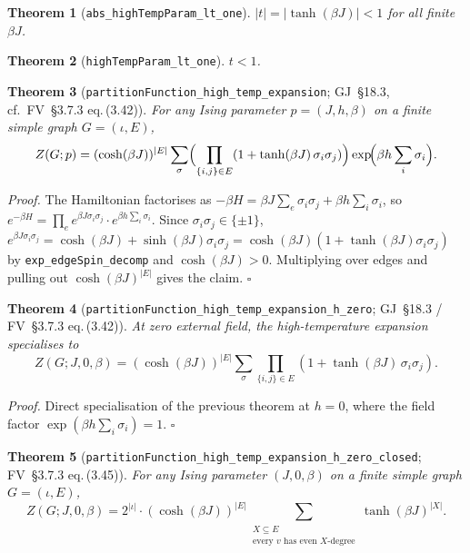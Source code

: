 \documentclass[a4paper,11pt]{article}
\newtheorem{theorem}{Theorem}
\begin{document}
\begin{theorem}[\texttt{abs\_highTempParam\_lt\_one}]
$|t| = |\tanh(\beta J)| < 1$ for all finite $\beta J$.
\end{theorem}

\begin{theorem}[\texttt{highTempParam\_lt\_one}]
$t < 1$.
\end{theorem}

\begin{theorem}[\texttt{partitionFunction\_high\_temp\_expansion}; GJ~\S18.3,
cf.\ FV~\S3.7.3 eq.\,(3.42)]
For any Ising parameter $p = (J, h, \beta)$ on a finite simple graph
$G = (\iota, E)$,
\[
Z(G; p) = (\cosh(\beta J))^{|E|}
\sum_{\sigma}
\Bigl(\prod_{\{i,j\} \in E} (1 + \tanh(\beta J)\,\sigma_i\sigma_j)\Bigr)
\exp\!\Bigl(\beta h \sum_i \sigma_i\Bigr).
\]
\end{theorem}

\textit{Proof.} The Hamiltonian factorises as
$-\beta H = \beta J \sum_e \sigma_i\sigma_j + \beta h \sum_i \sigma_i$,
so $e^{-\beta H} = \prod_e e^{\beta J \sigma_i\sigma_j} \cdot
e^{\beta h \sum_i \sigma_i}$.
Since $\sigma_i\sigma_j \in \{\pm 1\}$,
$e^{\beta J \sigma_i\sigma_j} = \cosh(\beta J) + \sinh(\beta J)\sigma_i\sigma_j
= \cosh(\beta J)(1 + \tanh(\beta J)\sigma_i\sigma_j)$
by \texttt{exp\_edgeSpin\_decomp} and $\cosh(\beta J) > 0$.
Multiplying over edges and pulling out $\cosh(\beta J)^{|E|}$ gives the claim.
\hfill$\square$

\begin{theorem}[\texttt{partitionFunction\_high\_temp\_expansion\_h\_zero}; GJ~\S18.3 / FV~\S3.7.3 eq.\,(3.42)]
At zero external field, the high-temperature expansion specialises to
\[
Z(G; J, 0, \beta) = (\cosh(\beta J))^{|E|}
\sum_{\sigma}
\prod_{\{i,j\} \in E} (1 + \tanh(\beta J)\,\sigma_i\sigma_j).
\]
\end{theorem}

\textit{Proof.} Direct specialisation of the previous theorem at $h = 0$,
where the field factor $\exp(\beta h \sum_i \sigma_i) = 1$.
\hfill$\square$

\begin{theorem}[\texttt{partitionFunction\_high\_temp\_expansion\_h\_zero\_closed}; FV~\S3.7.3 eq.\,(3.45)]
For any Ising parameter $(J, 0, \beta)$ on a finite simple graph
$G = (\iota, E)$,
\[
Z(G; J, 0, \beta) = 2^{|\iota|} \cdot (\cosh(\beta J))^{|E|}
\sum_{\substack{X \subseteq E \\ \text{every $v$ has even $X$-degree}}}
  \tanh(\beta J)^{|X|}.
\]
\end{theorem}
\end{document}
